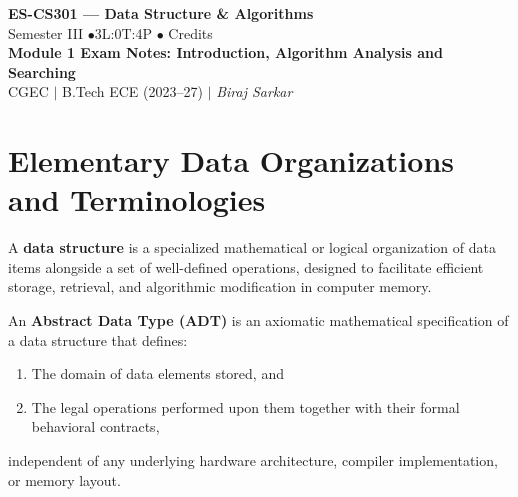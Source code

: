 \documentclass[12pt,a4paper]{article}
\begin{document}
\begin{center}
  {\LARGE\bfseries\color{myred} ES-CS301 --- Data Structure \& Algorithms}\\[5pt]
  {\normalsize\color{mydark} Semester III \quad$\bullet$\quad 3L:0T:4P \quad$\bullet$ Credits}\\[3pt]
  {\normalsize\color{myteal}\textbf{Module 1 Exam Notes: Introduction, Algorithm Analysis and Searching}}\\[3pt]
  {\small\color{mydark} CGEC \;$|$\; B.Tech ECE (2023--27) \;$|$\; \textit{Biraj Sarkar}}
\end{center}
\vspace{2pt}
\noindent{\color{myred}\rule{\linewidth}{1.5pt}}
\vspace{2pt}

\hypersetup{linkcolor=mydark}
\tableofcontents
\hypersetup{linkcolor=myteal}
\newpage

\section{Elementary Data Organizations and Terminologies}

\begin{tcolorbox}[defbox, title={\textbf{Definition: Data Structure and Abstract Data Type (ADT)}}]
A \textbf{data structure} is a specialized mathematical or logical organization of data items alongside a set of well-defined operations, designed to facilitate efficient storage, retrieval, and algorithmic modification in computer memory.
\par\vspace{4pt}
An \textbf{Abstract Data Type (ADT)} is an axiomatic mathematical specification of a data structure that defines:
\begin{enumerate}[leftmargin=*, nosep]
  \item The domain of data elements stored, and
  \item The legal operations performed upon them together with their formal behavioral contracts,
\end{enumerate}
independent of any underlying hardware architecture, compiler implementation, or memory layout.
\end{tcolorbox}
\end{document}
